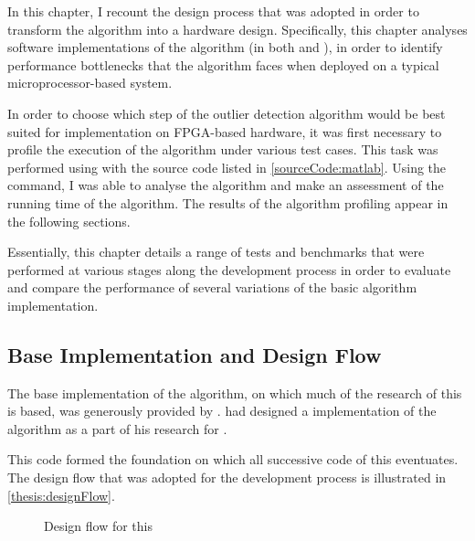 In this chapter, I recount the design process that was adopted in order to
transform the  algorithm into a
hardware design. Specifically, this chapter analyses software implementations of
the algorithm (in both  and ), in order to identify
performance bottlenecks that the algorithm faces when deployed on a typical
microprocessor-based system.

In order to choose which step of the outlier detection algorithm would be best
suited for implementation on \gls{FPGA}-based hardware, it was first necessary
to profile the execution of the algorithm under various test cases. This task
was performed using  with the source code listed in
\autoref{sourceCode:matlab}. Using the  
command, I was able to analyse the algorithm and make an assessment of the
running time of the algorithm. The results of the algorithm profiling appear in
the following sections.

Essentially, this chapter details a range of tests and benchmarks that were
performed at various stages along the development process in order to evaluate
and compare the performance of several variations of the basic algorithm
implementation.

\subsection{Base Implementation and Design Flow}
\label{software:baseImplementation}
The base implementation of the 
algorithm, on which much of the research of this \thesis{} is based, was
generously provided by . \citeauthor{Khoa:2012} had designed a
 implementation of the algorithm as a part of his research for
 \cite{Khoa:2012}.

This  code formed the foundation on which all successive code
of this \thesis{} eventuates. The design flow that was adopted for the
development process is illustrated in \autoref{thesis:designFlow}.

\begin{figure}
    \centering
    
    \caption{Design flow for this \thesis{}}
    \label{thesis:designFlow}
\end{figure}

